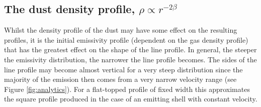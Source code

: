 \subsection{The dust density profile, $\rho \propto r^{-2\beta}$}
\label{beta}

Whilst the density profile of the dust may have some effect on the 
resulting profiles, it is the initial emissivity profile (dependent on the 
gas density profile) that has the greatest effect on the shape of the line 
profile.  In general, the steeper the emissivity distribution, the 
narrower the line profile becomes.  The sides of the line profile may 
become almost vertical for a very steep distribution since the majority of 
the emission then comes from a very narrow velocity range (see Figure 
\ref{fig:analytics}).  For a flat-topped profile of 
fixed width this approximates the square profile produced in the case of 
an emitting shell with constant velocity.

